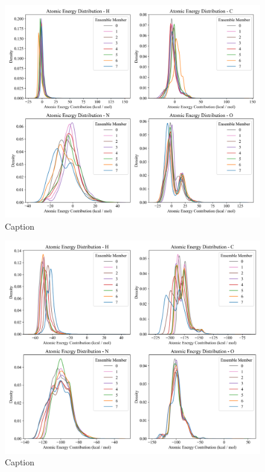 \begin{figure}[!ht]
    \centering
    \includegraphics[width=1\linewidth]{Images/2x_outputs/2x_1x-first_ae-per-model.png}
    \caption{Caption}
    \label{fig:2x_ae_per_model}
\end{figure}


\begin{figure}[!ht]
    \centering
    \includegraphics[width=1\linewidth]{Images/2xr_outputs/2xr_1x-first_ae-per-model.png}
    \caption{Caption}
    \label{fig:2xr_ae_per_model}
\end{figure}

